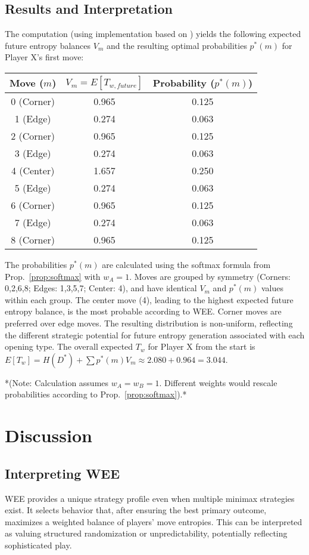 \documentclass{article}
\begin{document}
\subsection{Results and Interpretation}
The computation (using implementation based on \cite{placeholder_repo}) yields the following expected future entropy balances $V_m$ and the resulting optimal probabilities $p^*(m)$ for Player X's first move:

\begin{center}
\begin{tabular}{c|c|c}
Move ($m$) & $V_m = E[T_{w, future}]$ & Probability ($p^*(m)$) \\
\hline
0 (Corner) & 0.965 & 0.125 \\
1 (Edge)   & 0.274 & 0.063 \\
2 (Corner) & 0.965 & 0.125 \\
3 (Edge)   & 0.274 & 0.063 \\
4 (Center) & 1.657 & 0.250 \\
5 (Edge)   & 0.274 & 0.063 \\
6 (Corner) & 0.965 & 0.125 \\
7 (Edge)   & 0.274 & 0.063 \\
8 (Corner) & 0.965 & 0.125 \\
\end{tabular}
\end{center}

The probabilities $p^*(m)$ are calculated using the softmax formula from Prop.~\ref{prop:softmax} with $w_A=1$. Moves are grouped by symmetry (Corners: 0,2,6,8; Edges: 1,3,5,7; Center: 4), and have identical $V_m$ and $p^*(m)$ values within each group. The center move (4), leading to the highest expected future entropy balance, is the most probable according to WEE. Corner moves are preferred over edge moves. The resulting distribution is non-uniform, reflecting the different strategic potential for future entropy generation associated with each opening type. The overall expected $T_w$ for Player X from the start is $E[T_w] = H(D^*) + \sum p^*(m) V_m \approx 2.080 + 0.964 = 3.044$.

*(Note: Calculation assumes $w_A = w_B = 1$. Different weights would rescale probabilities according to Prop.~\ref{prop:softmax}).*

\section{Discussion}

\subsection{Interpreting WEE}
WEE provides a unique strategy profile even when multiple minimax strategies exist. It selects behavior that, after ensuring the best primary outcome, maximizes a weighted balance of players' move entropies. This can be interpreted as valuing structured randomization or unpredictability, potentially reflecting sophisticated play.
\end{document}
